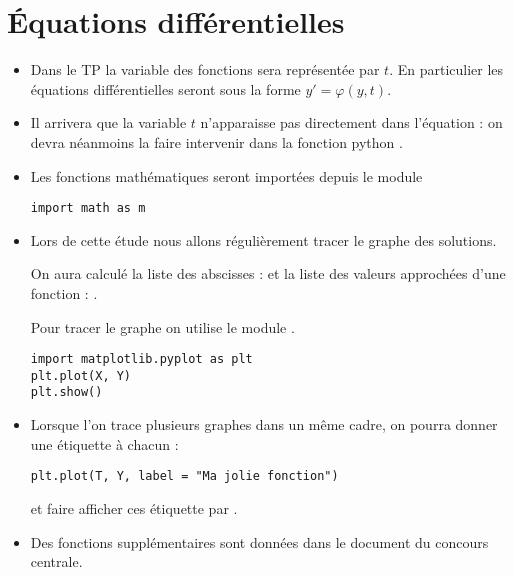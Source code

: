 \chapter{Équations différentielles}
\thispagestyle{empty}
\begin{itemize}
    \item Dans le TP la variable des fonctions sera représentée par $t$. En particulier les équations différentielles seront sous la forme $y' = \varphi(y, t)$.
    \item Il arrivera que la variable $t$ n'apparaisse pas directement dans l'équation : on devra néanmoins la faire intervenir dans la fonction python .
    \item Les fonctions mathématiques seront importées depuis le module 
\begin{lstlisting}
import math as m
\end{lstlisting}
    \item Lors de cette étude nous allons régulièrement tracer le graphe des solutions.

On aura calculé la liste des abscisses :  et la liste des valeurs approchées d'une fonction : .

Pour tracer le graphe on utilise le module .
\begin{lstlisting}
import matplotlib.pyplot as plt
plt.plot(X, Y)
plt.show()
\end{lstlisting}
\item Lorsque l'on trace plusieurs graphes dans un même cadre, on pourra donner une étiquette à chacun :
\begin{lstlisting}
plt.plot(T, Y, label = "Ma jolie fonction")
\end{lstlisting}
et faire afficher ces étiquette par .
\item Des fonctions supplémentaires sont données dans le document du concours centrale.
\end{itemize}
